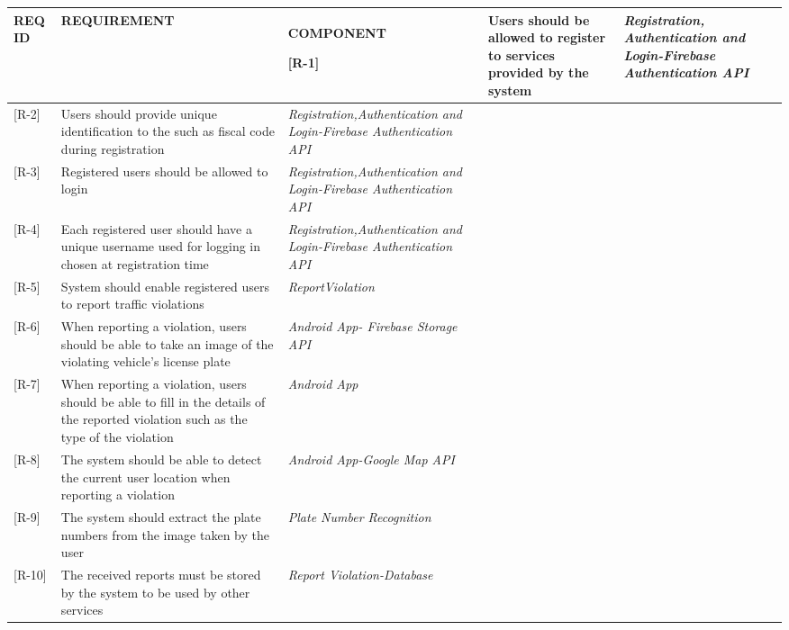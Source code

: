 \begin{table}[H]
\footnotesize
\centering
\settowidth{}
\setlength\extrarowheight{2pt}
\begin{tabulary}{\textwidth}{|J|J|J|J|J|}
\hline
 \textbf{REQ ID} & \textbf{REQUIREMENT} & \textbf{COMPONENT}   \hline

 [R-1] & Users should be allowed to register to services provided by the system & \emph{Registration, Authentication and Login-Firebase Authentication API} \\ \hline 
 
 [R-2] & Users should provide unique identification to the such as fiscal code during registration & \emph{Registration,Authentication and Login-Firebase Authentication API} 		\\ \hline 
 
 [R-3] & Registered users should be allowed to login & \emph{Registration,Authentication and Login-Firebase Authentication API} 		\\ \hline 
 
 [R-4] & Each registered user should have a unique username used for logging in chosen at registration time & \emph{Registration,Authentication and Login-Firebase Authentication API} 		\\ \hline 
 
 [R-5] & System should enable registered users to report traffic violations & \emph{ReportViolation} 		\\ \hline 
 
 [R-6] & When reporting a violation, users should be able to take an image of the violating vehicle’s license plate& \emph{Android App- Firebase Storage API} 		\\ \hline 
 
 [R-7] & When reporting a violation, users should be able to fill in the details of the reported violation such as the type of the violation & \emph{Android App} 		\\ \hline 
 
 [R-8] & The system should be able to detect the current user location when reporting a violation & \emph{Android App-Google Map API } 		\\ \hline 
 
 [R-9] & The system should extract the plate numbers from the image taken by the user & \emph{ Plate Number Recognition} 		\\ \hline 

 [R-10] & The received reports must be stored by the system to be used by other services & \emph{Report Violation-Database} 		\\ \hline 


\end{tabulary}
\end{table}
